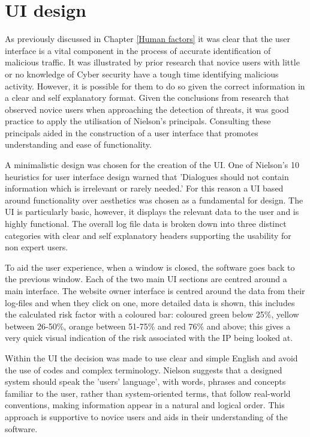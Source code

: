 \section{UI design} \label{ui}

As previously discussed in Chapter \ref{Human factors} it was clear that the user interface is a vital component in the process of accurate identification of malicious traffic. It was illustrated by prior research that novice users with little or no knowledge of Cyber security have a tough time identifying malicious activity. However, it is possible for them to do so given the correct information in a clear and self explanatory format. Given the conclusions from research that observed novice users when approaching the detection of threats, it was good practice to apply the utilisation of Nielson's principals. Consulting these principals aided in the construction of a user interface that promotes understanding and ease of functionality.

A minimalistic design was chosen for the creation of the UI. One of Nielson's 10 heuristics for user interface design warned that 'Dialogues should not contain information which is irrelevant or rarely needed.' For this reason a UI based around functionality over aesthetics was chosen as a fundamental for design. The UI is particularly basic, however, it displays the relevant data to the user and is highly functional. The overall log file data is broken down into three distinct categories with clear and self explanatory headers supporting the usability for non expert users.

To aid the user experience, when a window is closed, the software goes back to the previous window. Each of the two main UI sections are centred around a main interface. The website owner interface is centred around the data from their log-files and when they click on one, more detailed data is shown, this includes the calculated risk factor with a coloured bar: coloured green below 25\%, yellow between 26-50\%, orange between 51-75\% and red 76\% and above; this gives a very quick visual indication of the risk associated with the IP being looked at. 

Within the UI the decision was made to use clear and simple English and avoid the use of codes and complex terminology. Nielson suggests that a designed system should speak the 'users' language', with words, phrases and concepts familiar to the user, rather than system-oriented terms, that follow real-world conventions, making information appear in a natural and logical order. This approach is supportive to novice users and aids in their understanding of the software.

